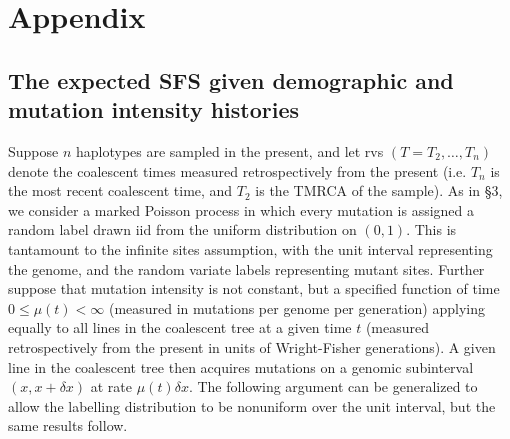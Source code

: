 \section{Appendix}\label{sec:appendix}

\subsection{The expected SFS given demographic and mutation intensity histories}\label{sec:appendix:xi}

Suppose $n$ haplotypes are sampled in the present, and let rvs $(T = T_2,\dots,T_n)$ denote the coalescent times measured retrospectively from the present (i.e. $T_n$ is the most recent coalescent time, and $T_2$ is the TMRCA of the sample).
As in \cite{Griffiths1998-qf} \S3, we consider a marked Poisson process in which every mutation is assigned a random label drawn iid from the uniform distribution on $(0,1)$.
This is tantamount to the infinite sites assumption, with the unit interval representing the genome, and the random variate labels representing mutant sites.
Further suppose that mutation intensity is not constant, but a specified function of time $0\le \mu(t)<\infty$ (measured in mutations per genome per generation) applying equally to all lines in the coalescent tree at a given time $t$ (measured retrospectively from the present in units of Wright-Fisher generations).
A given line in the coalescent tree then acquires mutations on a genomic subinterval $(x,x+\delta x)$ at rate $\mu(t)\delta x$.
The following argument can be generalized to allow the labelling distribution to be nonuniform over the unit interval, but the same results follow.

